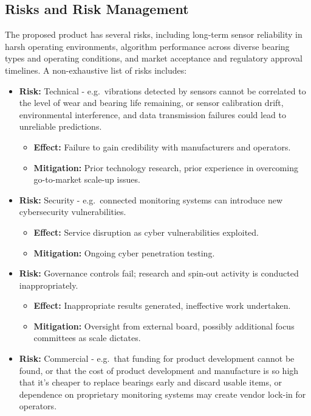 \documentclass[runningheads]{llncs}
\begin{document}
\subsection{Risks and Risk Management}
    The proposed product has several risks, including long-term sensor reliability in harsh operating environments, algorithm performance across diverse bearing types and operating conditions, and market acceptance and regulatory approval timelines. A non-exhaustive list of risks includes:
    \begin{itemize}
        \item \textbf{Risk:} Technical - e.g.\ vibrations detected by sensors cannot be correlated to the level of wear and bearing life remaining, or sensor calibration drift, environmental interference, and data transmission failures could lead to unreliable predictions.
        \begin{itemize}
            \item \textbf{Effect:} Failure to gain credibility with manufacturers and operators.
            \item \textbf{Mitigation:} Prior technology research, prior experience in overcoming go-to-market scale-up issues.
        \end{itemize}
        \item \textbf{Risk:} Security - e.g.\ connected monitoring systems can introduce new cybersecurity vulnerabilities.
        \begin{itemize}
            \item \textbf{Effect:} Service disruption as cyber vulnerabilities exploited.
            \item \textbf{Mitigation:} Ongoing cyber penetration testing.
        \end{itemize}
        \item \textbf{Risk:} Governance controls fail; research and spin-out activity is conducted inappropriately.
        \begin{itemize}
            \item \textbf{Effect:} Inappropriate results generated, ineffective work undertaken.
            \item \textbf{Mitigation:} Oversight from external board, possibly additional focus committees as scale dictates.
        \end{itemize}
        \item \textbf{Risk:} Commercial - e.g.\ that funding for product development cannot be found, or that the cost of product development and manufacture is so high that it's cheaper to replace bearings early and discard usable items, or dependence on proprietary monitoring systems may create vendor lock-in for operators.

\end{itemize}
\end{document}
